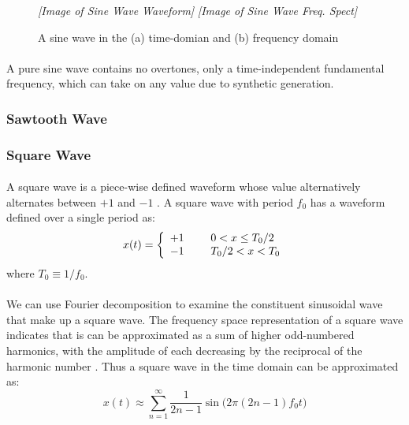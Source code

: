 \documentclass[12pt,letterpaper]{article}
\begin{document}
\begin{figure}[h]
\begin{center}
	\textit{[Image of Sine Wave Waveform]}
	\textit{[Image of Sine Wave Freq. Spect]}
\end{center}
\caption{A sine wave in the (a) time-domian and (b) frequency domain}
\label{fig-SineWave}
\end{figure} 

\paragraph*{}A pure sine wave contains no overtones, only a time-independent fundamental frequency, which can take on any value due to synthetic generation.


\subsubsection{Sawtooth Wave}

\paragraph*{}


\subsubsection{Square Wave}

\paragraph*{}A square wave is a piece-wise defined waveform whose value alternatively alternates between $+1$ and $-1$ \cite{White,Olson}. A square wave with period $f_0$ has a waveform defined over a single period as:
\begin{equation}
\label{eqn-SquareWave}
x(t) =  \left\{
\begin{array}{ll}
    +1 & \text{\hspace{0.5cm}} 0 < x \leq T_0 / 2 \\
    -1 & \text{\hspace{0.5cm}} T_0/2 < x < T_0
\end{array} 
\right.
\end{equation}
where $T_0 \equiv 1/f_0$.

\paragraph*{}We can use Fourier decomposition to examine the constituent sinusoidal wave that make up a square wave. The frequency space representation of a square wave indicates that is can be approximated as a sum of higher odd-numbered harmonics, with the amplitude of each decreasing by the reciprocal of the harmonic number \cite{White}. Thus a square wave in the time domain can be approximated as:
\begin{equation}
x(t) \approx \sum_{n = 1}^{\infty} \frac{1}{2n-1} \sin \bigg( 2 \pi (2n - 1)f_0 t \bigg)
\end{equation} 
\end{document}
